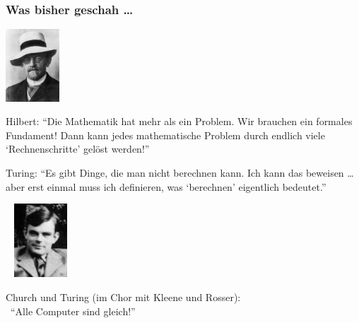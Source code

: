 \documentclass[onlymath]{beamer}
\begin{document}
\maketitle

\begin{frame}\frametitle{Was bisher geschah \ldots}\label{frame_hilbert}\label{frame_turing_child}

\begin{minipage}{2.3cm}
\includegraphics[width=2cm]{images/Hilbert}
\end{minipage}
\begin{minipage}{7.5cm}
Hilbert: "`Die Mathematik hat mehr als ein Problem. Wir brauchen ein formales Fundament! Dann kann jedes mathematische Problem durch endlich viele `Rechnenschritte' gelöst werden!"'
\end{minipage}

\bigskip

\begin{minipage}{7.3cm}
Turing: "`Es gibt Dinge, die man nicht berechnen kann. Ich kann das beweisen \ldots{} aber erst einmal muss ich definieren, was `berechnen' eigentlich bedeutet."'
\end{minipage}
\begin{minipage}{2.4cm}
~\hspace{4mm}
\includegraphics[width=2cm]{images/Turing}
\end{minipage}

\bigskip

Church und Turing (im Chor mit Kleene und Rosser):\\~\hfill"`Alle Computer sind gleich!"'\hfill~

\end{frame}
\end{document}
